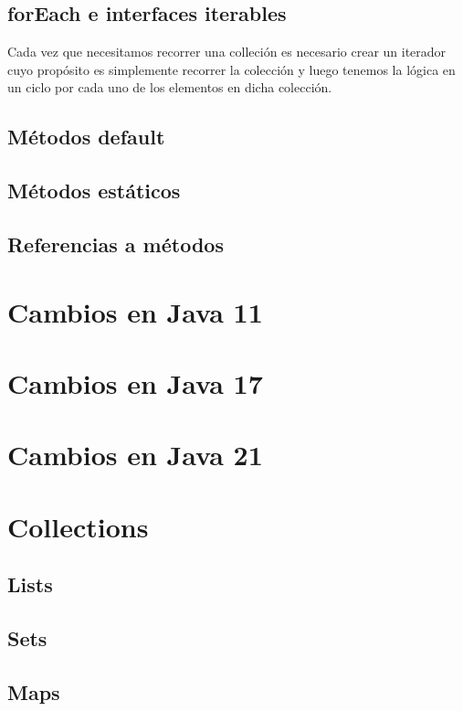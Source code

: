\documentclass[12pt,article,oneside]{memoir}
\begin{document}
			\subsection{forEach e interfaces iterables} 
			Cada vez que necesitamos recorrer una colleci\'on es necesario crear un iterador cuyo prop\'osito es simplemente 
			recorrer la colecci\'on y luego tenemos la l\'ogica en un ciclo por cada uno de los elementos en dicha colecci\'on.
			
			\subsection{M\'etodos default}
			
			\subsection{M\'etodos est\'aticos}
			
			\subsection{Referencias a m\'etodos}
			\newpage
	
		\section{Cambios en Java 11}
		\newpage
	
		\section{Cambios en Java 17}
		\newpage
			
		\section{Cambios en Java 21}
		\newpage
		
		\section{Collections}
			\subsection{Lists}
			\newpage
			\subsection{Sets}
			\newpage
			\subsection{Maps}
		\newpage
		
\end{document}
